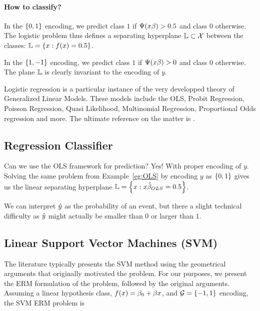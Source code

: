 \paragraph{How to classify?}
In the $\left\{ 0,1 \right\}$ encoding, we predict class $1$ if $\Psi(x\beta)>0.5$ and class $0$ otherwise.
The logistic problem thus defines a separating hyperplane $\mathbb{L} \subset \mathcal{X}$ between the classes: $\mathbb{L}=\left\{ x:f(x)=0.5 \right\}$.

In the $\left\{ 1,-1 \right\}$ encoding, we predict class $1$ if $\Psi(x\beta)>0$ and class $0$ otherwise.
The plane $\mathbb{L}$ is clearly invariant to the encoding of $y$.




\begin{remark}
Logistic regression is a particular instance of the very developped theory of Generalized Linear Models.
These models include the OLS, Probit Regression, Poisson Regression, Quasi Likelihood, Multinomial Regression, Proportional Odds regression and more.
The ultimate reference on the matter is \cite{mccullagh_generalized_1989}.
\end{remark}




\subsection{Regression Classifier}
\label{sec:regression_classifier}
Can we use the OLS framework for prediction? Yes! With proper encoding of $y$.
Solving the same problem from Example~\ref{eg:OLS} by encoding $y$ as $\left\{ 0,1 \right\}$ gives us the linear separating hyperplane $\mathbb{L}= \left\{ x:x\hat{\beta}_{OLS}=0.5 \right\}$.

\begin{remark}
We can interpret $\hat{y}$ as the probability of an event, but there a slight technical difficulty as $\hat{y}$ might actually be smaller than $0$ or larger than $1$.
\end{remark}




\subsection{Linear Support Vector Machines (SVM)}
\label{sec:svm}

The literature typically presents the SVM method using the geometrical arguments that originally motivated the problem. 
For our purposes, we present the ERM formulation of the problem, followed by the original arguments.
Assuming a linear hypothesis class, $f(x)=\beta_0+\beta x$, and $\mathcal{G}=\left\{ -1,1 \right\}$ encoding, the SVM ERM problem is

